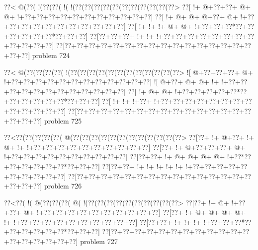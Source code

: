 \vbox{\vbox{\goo
\0??<\- @(\0??(\- !(\0??(\0??(\- !(\- !(\0??(\0??(\0??(\0??(\0??(\0??(\0??(\0??(\0??(\0??(\0??>
\0??[\- !+\- @+\0??+\0??+\- @+\- @+\- !+\0??+\0??+\0??+\0??+\0??+\0??+\0??+\0??+\0??+\0??+\0??]
\0??[\- !+\- @+\- @+\- @+\0??+\- @+\- !+\0??+\0??+\0??+\0??+\0??+\0??+\0??+\0??+\0??+\0??+\0??]
\0??[\- !+\- !+\- !+\- @+\- @+\- !+\0??+\0??+\0??*\0??+\0??+\0??+\0??+\0??+\0??*\0??+\0??+\0??]
\0??[\0??+\0??+\0??+\- !+\- !+\- !+\0??+\0??+\0??+\0??+\0??+\0??+\0??+\0??+\0??+\0??+\0??+\0??]
\0??[\0??+\0??+\0??+\0??+\0??+\0??+\0??+\0??+\0??+\0??+\0??+\0??+\0??+\0??+\0??+\0??+\0??+\0??]
}
\hfil problem 724\hfil\break
}



\vbox{\vbox{\goo
\0??<\- @(\0??(\0??(\0??(\0??(\- !(\0??(\0??(\0??(\0??(\0??(\0??(\0??(\0??(\0??(\0??(\0??(\0??>
\- ![\- @+\0??+\0??+\0??+\- @+\- !+\0??+\0??+\0??+\0??+\0??+\0??+\0??+\0??+\0??+\0??+\0??+\0??]
\- ![\- @+\0??+\- @+\- @+\- !+\- !+\0??+\0??+\0??+\0??+\0??+\0??+\0??+\0??+\0??+\0??+\0??+\0??]
\0??[\- !+\- @+\- @+\- !+\0??+\0??+\0??+\0??+\0??*\0??+\0??+\0??+\0??+\0??+\0??*\0??+\0??+\0??]
\0??[\- !+\- !+\- !+\0??+\- !+\0??+\0??+\0??+\0??+\0??+\0??+\0??+\0??+\0??+\0??+\0??+\0??+\0??]
\0??[\0??+\0??+\0??+\0??+\0??+\0??+\0??+\0??+\0??+\0??+\0??+\0??+\0??+\0??+\0??+\0??+\0??+\0??]
}
\hfil problem 725\hfil\break
}



\vbox{\vbox{\goo
\0??<\0??(\0??(\0??(\0??(\0??(\- @(\0??(\0??(\0??(\0??(\0??(\0??(\0??(\0??(\0??(\0??(\0??(\0??>
\0??[\0??+\- !+\- @+\0??+\- !+\- @+\- !+\- !+\0??+\0??+\0??+\0??+\0??+\0??+\0??+\0??+\0??+\0??]
\0??[\0??+\- !+\- @+\0??+\0??+\0??+\- @+\- !+\0??+\0??+\0??+\0??+\0??+\0??+\0??+\0??+\0??+\0??]
\0??[\0??+\0??+\- !+\- @+\- @+\- @+\- @+\- !+\0??*\0??+\0??+\0??+\0??+\0??+\0??*\0??+\0??+\0??]
\0??[\0??+\0??+\- !+\- !+\- !+\- !+\- !+\- !+\0??+\0??+\0??+\0??+\0??+\0??+\0??+\0??+\0??+\0??]
\0??[\0??+\0??+\0??+\0??+\0??+\0??+\0??+\0??+\0??+\0??+\0??+\0??+\0??+\0??+\0??+\0??+\0??+\0??]
}
\hfil problem 726\hfil\break
}



\vbox{\vbox{\goo
\0??<\0??(\- !(\- @(\0??(\0??(\0??(\- @(\- !(\0??(\0??(\0??(\0??(\0??(\0??(\0??(\0??(\0??(\0??>
\0??[\0??+\- !+\- @+\- !+\0??+\0??+\- @+\- !+\0??+\0??+\0??+\0??+\0??+\0??+\0??+\0??+\0??+\0??]
\0??[\0??+\- !+\- @+\- @+\- @+\- @+\- !+\- !+\0??+\0??+\0??+\0??+\0??+\0??+\0??+\0??+\0??+\0??]
\0??[\0??+\0??+\- !+\- !+\- !+\- !+\0??+\0??+\0??*\0??+\0??+\0??+\0??+\0??+\0??*\0??+\0??+\0??]
\0??[\0??+\0??+\0??+\0??+\0??+\0??+\0??+\0??+\0??+\0??+\0??+\0??+\0??+\0??+\0??+\0??+\0??+\0??]
}
\hfil problem 727\hfil\break
}



